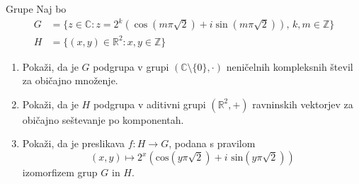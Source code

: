 \begin{frame}{Grupe}
	Naj bo
	\begin{align*}
    G &= \{ z \in \mathbb{C} : z = 2^k (\cos(m \pi \sqrt{2}) + i \sin(m \pi \sqrt{2})), \, k, m \in \mathbb{Z} \} \\
    H &= \{ (x, y) \in \mathbb{R}^2 : x, y \in \mathbb{Z} \}
	\end{align*}
	\begin{enumerate}
		\item
			Pokaži, da je $G$ podgrupa v grupi $(\mathbb{C} \setminus \{0\}, \cdot)$
			neničelnih kompleksnih števil za običajno množenje.
		\item
			Pokaži, da je $H$ podgrupa v aditivni grupi $(\mathbb{R}^2, +)$
			ravninskih vektorjev za običajno seštevanje po komponentah.
		\item
			Pokaži, da je preslikava $f:H\to G$, podana s pravilom
			$$(x,y) \mapsto 2^x(\text{cos}(y\pi\sqrt{2})+i\text{ sin}(y\pi\sqrt{2}))$$
			izomorfizem grup $G$ in $H$.
	\end{enumerate}
\end{frame}
